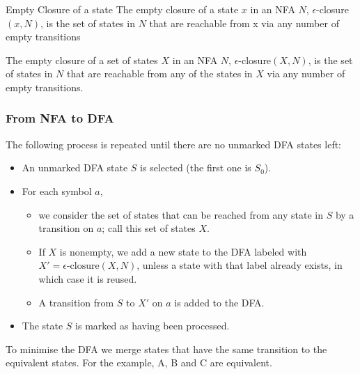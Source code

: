 Empty Closure of a state
The empty closure of a state $x$ in an NFA $N$, $\epsilon$-closure$(x, N)$, is
the set of states in $N$ that are reachable from x via any number
of empty transitions

The empty closure of a set of states $X$ in an NFA $N$, $\epsilon$-closure$(X , N)$, is the set of states in $N$ that are reachable from any of the states in $X$ via any number of empty transitions. 

\subsubsection{From NFA to DFA}

The following process is repeated until there are no unmarked DFA states left:
\begin{itemize}
    \item An unmarked DFA state $S$ is selected (the first one is $S_0$).
    \item For each symbol $a$,
    \begin{itemize}
        \item we consider the set of states that can be reached from any state in $S$ by a transition on $a$; call this set of states $X$.
        \item If $X$ is nonempty, we add a new state to the DFA labeled with $X' = \epsilon\text{-closure}(X, N)$, unless a state with that label already exists, in which case it is reused.
        \item A transition from $S$ to $X'$ on $a$ is added to the DFA.
    \end{itemize}
    \item The state $S$ is marked as having been processed.
\end{itemize}

To minimise the DFA we merge states that have the same
transition to the equivalent states. For the example, A, B and C
are equivalent.